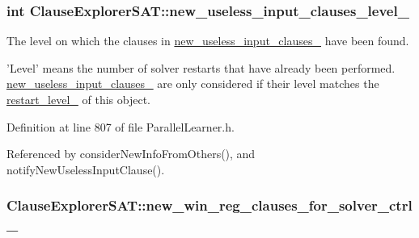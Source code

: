 \hypertarget{classClauseExplorerSAT_a67eeafbba9da9c87534f7ef26531a57a}{
\subsubsection[{new\-\_\-useless\-\_\-input\-\_\-clauses\-\_\-level\-\_\-}]{\setlength{\rightskip}{0pt plus 5cm}int Clause\-Explorer\-S\-A\-T\-::new\-\_\-useless\-\_\-input\-\_\-clauses\-\_\-level\-\_\-\hspace{0.3cm}{\ttfamily [protected]}}}\label{classClauseExplorerSAT_a67eeafbba9da9c87534f7ef26531a57a}


The level on which the clauses in \hyperlink{classClauseExplorerSAT_a3d1bdb9a6484c85af655a4eed1ee5f19}{new\-\_\-useless\-\_\-input\-\_\-clauses\-\_\-} have been found. 

'Level' means the number of solver restarts that have already been performed. \hyperlink{classClauseExplorerSAT_a3d1bdb9a6484c85af655a4eed1ee5f19}{new\-\_\-useless\-\_\-input\-\_\-clauses\-\_\-} are only considered if their level matches the \hyperlink{classClauseExplorerSAT_a0b5d716111026dd1cb4efe5855e2fe2f}{restart\-\_\-level\-\_\-} of this object. 

Definition at line 807 of file Parallel\-Learner.\-h.



Referenced by consider\-New\-Info\-From\-Others(), and notify\-New\-Useless\-Input\-Clause().

\hypertarget{classClauseExplorerSAT_a7d923928f3cb6209b29f5cc5104b5fe2}{
\subsubsection[{new\-\_\-win\-\_\-reg\-\_\-clauses\-\_\-for\-\_\-solver\-\_\-ctrl\-\_\-}]{ Clause\-Explorer\-S\-A\-T\-::new\-\_\-win\-\_\-reg\-\_\-clauses\-\_\-for\-\_\-solver\-\_\-ctrl\-\_\-\hspace{0.3cm}{\ttfamily [protected]}}}\label{classClauseExplorerSAT_a7d923928f3cb6209b29f5cc5104b5fe2}


